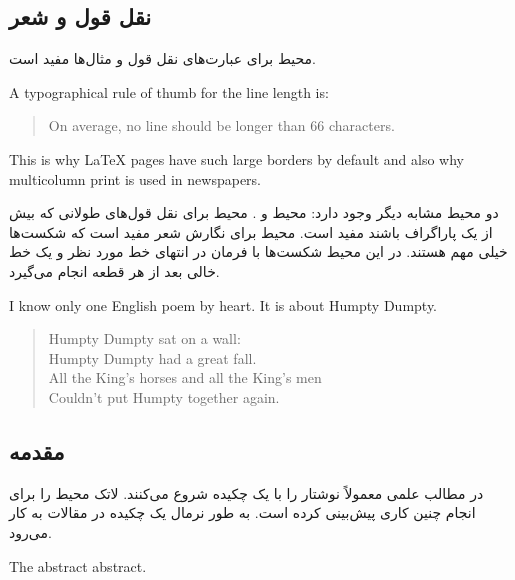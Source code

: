 \subsection{نقل قول و شعر}
محیط 
برای عبارت‌های نقل‌ قول و مثال‌ها مفید است.

\begin{example}
A typographical rule of thumb
for the line length is:
\begin{quote}
On average, no line should
be longer than 66 characters.
\end{quote}
This is why \LaTeX{} pages have 
such large borders by default
and also why multicolumn print
is used in newspapers.
\end{example}
دو محیط مشابه دیگر وجود دارد: محیط
و 
.
محیط 
برای نقل‌ قول‌های طولانی که بیش از یک پاراگراف باشند مفید است. محیط 
برای نگارش شعر مفید است که شکست‌ها خیلی مهم هستند. در این محیط شکست‌ها با فرمان 
\ci{\bs}
در انتهای خط مورد نظر و یک خط خالی بعد از هر قطعه انجام می‌گیرد.


\begin{example}
I know only one English poem by 
heart. It is about Humpty Dumpty.
\begin{flushleft}
\begin{verse}
Humpty Dumpty sat on a wall:\\
Humpty Dumpty had a great fall.\\ 
All the King's horses and all
the King's men\\
Couldn't put Humpty together
again.
\end{verse}
\end{flushleft}
\end{example}
\subsection{مقدمه}
در مطالب علمی معمولاً نوشتار را با یک چکیده شروع می‌کنند. لاتک محیط
را برای انجام چنین کاری پیش‌بینی کرده است. به طور نرمال یک چکیده در مقالات به کار می‌رود.

\newenvironment{abstract}%
        {\begin{center}\begin{small}\begin{minipage}{0.8\textwidth}}%
        {\end{minipage}\end{small}\end{center}}
\begin{example}
\begin{abstract}
The abstract abstract.
\end{abstract}
\end{example}

